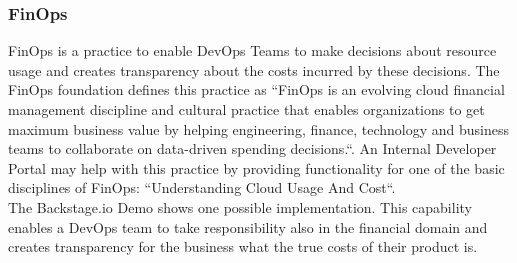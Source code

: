 \documentclass[a4paper,10pt]{article}
\begin{document}
    \subsubsection{FinOps}
    \label{sssec:finops}
    FinOps is a practice to enable DevOps Teams to make decisions about resource usage and creates transparency
    about the costs incurred by these decisions.
    The FinOps foundation defines\parencite{finopsdefinition} this practice as ``FinOps is an evolving cloud financial
    management discipline and cultural practice that enables organizations to get maximum business value by helping
    engineering, finance, technology and business teams to collaborate on data-driven spending decisions.``.
    An Internal Developer Portal may help with this practice by providing functionality for one of the basic disciplines
    of FinOps: ``Understanding Cloud Usage And Cost``.\\
    The Backstage.io Demo\parencite{backstagedemocost} shows one possible implementation.
    This capability enables a DevOps team to take responsibility also in the financial domain and creates transparency
    for the business what the true costs of their product is.
\end{document}
